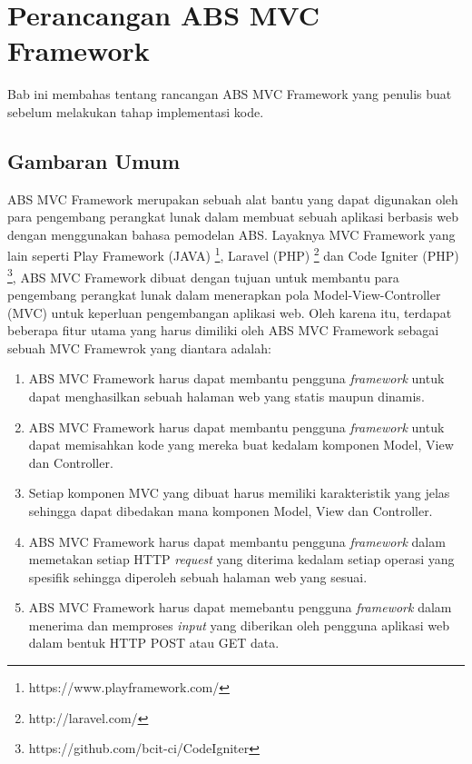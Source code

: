 \chapter{Perancangan ABS MVC Framework}

Bab ini membahas tentang rancangan ABS MVC Framework yang penulis buat sebelum melakukan tahap implementasi kode.

\section{Gambaran Umum}

ABS MVC Framework merupakan sebuah alat bantu yang dapat digunakan oleh para pengembang perangkat lunak dalam membuat sebuah aplikasi berbasis web dengan menggunakan bahasa pemodelan ABS. Layaknya MVC Framework yang lain seperti Play Framework (JAVA) \footnote{https://www.playframework.com/}, Laravel (PHP) \footnote{http://laravel.com/} dan Code Igniter (PHP) \footnote{https://github.com/bcit-ci/CodeIgniter}, ABS MVC Framework dibuat dengan tujuan untuk membantu para pengembang perangkat lunak dalam menerapkan pola Model-View-Controller (MVC) untuk keperluan pengembangan aplikasi web. Oleh karena itu, terdapat beberapa fitur utama yang harus dimiliki oleh ABS MVC Framework sebagai sebuah MVC Framewrok yang diantara adalah:

\begin{enumerate}
    \item ABS MVC Framework harus dapat membantu pengguna \textit{framework} untuk dapat menghasilkan sebuah halaman web yang statis maupun dinamis.
    \item ABS MVC Framework harus dapat membantu pengguna \textit{framework} untuk dapat memisahkan kode yang mereka buat kedalam komponen Model, View dan Controller.
    \item Setiap komponen MVC yang dibuat harus memiliki karakteristik yang jelas sehingga dapat dibedakan mana komponen Model, View dan Controller.
    \item ABS MVC Framework harus dapat membantu pengguna \textit{framework} dalam memetakan setiap HTTP \textit{request} yang diterima kedalam setiap operasi yang spesifik sehingga diperoleh sebuah halaman web yang sesuai.
    \item ABS MVC Framework harus dapat memebantu pengguna \textit{framework} dalam menerima dan memproses \textit{input} yang diberikan oleh pengguna aplikasi web dalam bentuk HTTP POST atau GET data. 
\end{enumerate}

